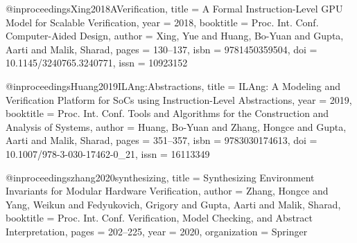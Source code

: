 @inproceedings{Xing2018AVerification,
    title = {{A Formal Instruction-Level GPU Model for Scalable Verification}},
    year = {2018},
    booktitle = {Proc. Int. Conf. Computer-Aided Design},
    author = {Xing, Yue and Huang, Bo-Yuan and Gupta, Aarti and Malik, Sharad},
    pages = {130--137},
    isbn = {9781450359504},
    doi = {10.1145/3240765.3240771},
    issn = {10923152}
}

@inproceedings{Huang2019ILAng:Abstractions,
    title = {{ILAng: A Modeling and Verification Platform for SoCs using Instruction-Level Abstractions}},
    year = {2019},
    booktitle = {Proc. Int. Conf. Tools and Algorithms for the Construction and Analysis of Systems},
    author = {Huang, Bo-Yuan and Zhang, Hongce and Gupta, Aarti and Malik, Sharad},
    pages = {351--357},
    isbn = {9783030174613},
    doi = {10.1007/978-3-030-17462-0{\_}21},
    issn = {16113349}
}

@inproceedings{zhang2020synthesizing,
  title = {{Synthesizing Environment Invariants for Modular Hardware Verification}},
  author = {Zhang, Hongce and Yang, Weikun and Fedyukovich, Grigory and Gupta, Aarti and Malik, Sharad},
  booktitle = {Proc. Int. Conf. Verification, Model Checking, and Abstract Interpretation},
  pages = {202--225},
  year = {2020},
  organization = {Springer}
}
